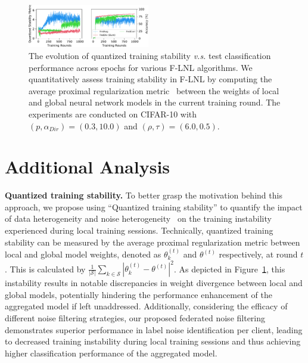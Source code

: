 \documentclass[letterpaper]{article} %
\begin{document}
\begin{figure}[t]
    \centering

    \includegraphics[width=0.475\textwidth]{figures/stabiltiy_visualization.pdf}

    \caption{The evolution of quantized training stability \textit{v.s.} test classification performance across epochs for various F-LNL algorithms. We quantitatively assess training stability in F-LNL by computing the average proximal regularization metric~\cite{FedProx, xu2022fedcorr} between the weights of local and global neural network models in the current training round. The experiments are conducted on CIFAR-10 with $(p, \alpha_{Dir})=(0.3, 10.0)$ and $(\rho, \tau)=(6.0, 0.5)$.
    }
    \label{Figure:Instability}
\end{figure}

\section{Additional Analysis}

\noindent
\textbf{Quantized training stability.}
To better grasp the motivation behind this approach, we propose using ``Quantized training stability'' to quantify the impact of data heterogeneity and noise heterogeneity~\cite{kim2022fedrn,RoFL} on the training instability experienced during local training sessions. Technically, quantized training stability can be measured by the average proximal regularization metric between local and global model weights, denoted as $\theta_{k}^{(t)}$ and $\theta^{(t)}$ respectively, at round $t$. This is calculated by $\frac{1}{|\mathcal{S}|}\sum_{k\in\mathcal{S}} |\theta_{k}^{(t)}- \theta^{(t)}|^{2}$. As depicted in Figure~\textcolor{red}{\ref{Figure:Instability}}, this instability results in notable discrepancies in weight divergence between local and global models, potentially hindering the performance enhancement of the aggregated model if left unaddressed. Additionally, considering the efficacy of different noise filtering strategies, our proposed federated noise filtering demonstrates superior performance in label noise identification per client, leading to decreased training instability during local training sessions and thus achieving higher classification performance of the aggregated model.
\end{document}
